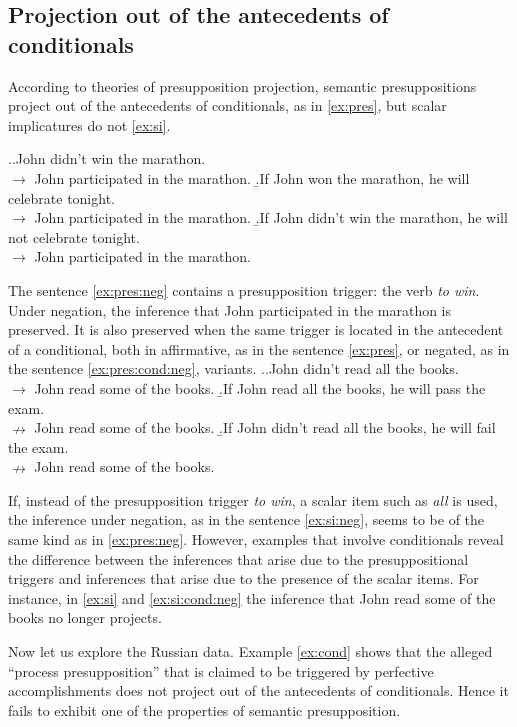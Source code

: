 \subsection{Projection out of the antecedents of conditionals}
According to theories of presupposition projection, semantic presuppositions project out of the antecedents of conditionals, as in \ref{ex:pres}, but scalar implicatures do not \ref{ex:si}.

\ex.\a.\label{ex:pres:neg}John didn't win the marathon.\\
$\rightarrow$ John participated in the marathon.
\b.\label{ex:pres}If John won the marathon, he will celebrate tonight.\\
$\rightarrow$ John participated in the marathon.
\b.\label{ex:pres:cond:neg}If John didn't win the marathon, he will not celebrate tonight.\\
$\rightarrow$ John participated in the marathon.

The sentence \ref{ex:pres:neg} contains a presupposition trigger: the verb \textit{to win}. Under negation, the inference that John participated in the marathon is preserved. It is also preserved when the same trigger is located in the antecedent of a conditional, both in affirmative, as in the sentence \ref{ex:pres}, or negated, as in the sentence \ref{ex:pres:cond:neg}, variants.
\ex.\a.\label{ex:si:neg}John didn't read all the books.\\
$\rightarrow$ John read some of the books.
\b.\label{ex:si}If John read all the books, he will pass the exam.\\
$\nrightarrow$ John read some of the books.
\b.\label{ex:si:cond:neg}If John didn't read all the books, he will fail the exam.\\
$\nrightarrow$ John read some of the books.

If, instead of the presupposition trigger \textit{to win}, a scalar item such as \textit{all} is used, the inference under negation, as in the sentence \ref{ex:si:neg}, seems to be of the same kind as in \ref{ex:pres:neg}. However, examples that involve conditionals reveal the difference between the inferences that arise due to the presuppositional triggers and inferences that arise due to the presence of the scalar items. For instance, in \ref{ex:si} and \ref{ex:si:cond:neg} the inference that John read some of the books no longer projects.

Now let us explore the Russian data. Example \ref{ex:cond} shows that the alleged ``process presupposition'' that is claimed to be triggered by perfective accomplishments does not project out of the antecedents of conditionals. Hence it fails to exhibit one of the properties of semantic presupposition.

